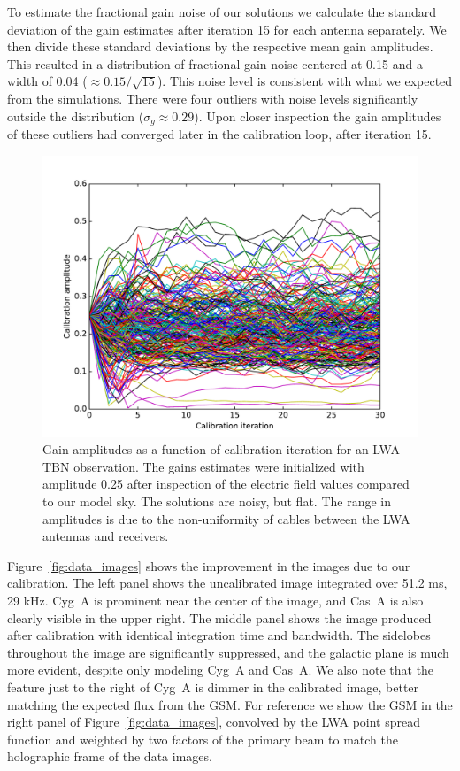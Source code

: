 \documentclass[a4paper,fleqn,usenatbib]{mnras}
\begin{document}
To estimate the fractional gain noise of our solutions we calculate the standard deviation of the gain
estimates after iteration 15 for each antenna separately. We then divide these standard
deviations by the respective mean gain amplitudes. This resulted in a distribution of fractional
gain noise centered at 0.15 and a width of 0.04 ($\approx 0.15/\sqrt{15}$). This noise level
is consistent with what we expected from the simulations.
There were four outliers with noise levels significantly outside the distribution 
($\sigma_g \approx 0.29$). Upon closer inspection the gain amplitudes of these outliers had
converged later in the calibration loop, after iteration 15.

\begin{figure}
\begin{center}
\includegraphics[width=\columnwidth]{fig8.pdf}
\caption{Gain amplitudes as a function of calibration iteration for an LWA TBN observation. The 
gains estimates were initialized with amplitude 0.25 after inspection of the electric field values 
compared to our model sky. The solutions are noisy, but flat. The range in amplitudes is due to 
the non-uniformity of cables between the LWA antennas and receivers.
}
\label{fig:data_amp}
\end{center}
\end{figure}

Figure~\ref{fig:data_images} shows the improvement in the images due to our calibration. The 
left panel shows the uncalibrated image integrated over 51.2 ms, 29 kHz. Cyg~A is prominent 
near the center of the image, and Cas~A is also clearly visible in the upper right. The middle 
panel shows the image produced after calibration with identical integration time and bandwidth. 
The sidelobes throughout the image are significantly suppressed, and the galactic plane is 
much more evident, despite only modeling Cyg~A and Cas~A. We also note that the feature 
just to the right of Cyg~A is dimmer in the calibrated image, better matching the expected flux 
from the GSM. 
For reference we show the GSM in the right panel of 
Figure~\ref{fig:data_images}, convolved by the LWA point spread function and weighted
by  two factors of the primary beam to match the holographic frame of the data images.
\end{document}
